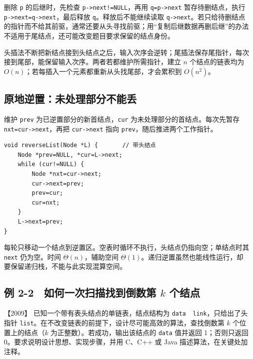 删除 \allowbreak{}\texttt{p} 的后继时，先检查 \allowbreak{}\texttt{p-\textgreater{}next!=NULL}，再用 \allowbreak{}\texttt{q=p-\textgreater{}next} 暂存待删结点，执行 \allowbreak{}\texttt{p-\textgreater{}next=q-\textgreater{}next}，最后释放 \allowbreak{}\texttt{q}。释放后不能继续读取 \allowbreak{}\texttt{q-\textgreater{}next}。若只给待删结点的指针而不给其前驱，通常还要从头寻找前驱；用``复制后继数据再删后继''的办法不适用于尾结点，还可能改变题目要求保留的结点身份。

头插法不断把新结点接到头结点之后，输入次序会逆转；尾插法保存尾指针，每次接到尾部，能保留输入次序。两者若都维护所需指针，建立 \(n\) 个结点的链表均为 \(O(n)\)；若每插入一个元素都重新从头找尾部，才会累积到 \(O(n^2)\)。

\subsection{原地逆置：未处理部分不能丢}\label{ds-c02-h52}

维护 \allowbreak{}\texttt{prev} 为已逆置部分的新首结点，\allowbreak{}\texttt{cur} 为未处理部分的首结点。每次先暂存 \allowbreak{}\texttt{nxt=cur-\textgreater{}next}，再把 \allowbreak{}\texttt{cur-\textgreater{}next} 指向 \allowbreak{}\texttt{prev}，随后推进两个工作指针。

\par\medskip\noindent
\begin{minipage}{\linewidth}
\begin{verbatim}
void reverseList(Node *L) {       // 带头结点
    Node *prev=NULL, *cur=L->next;
    while (cur!=NULL) {
        Node *nxt=cur->next;
        cur->next=prev;
        prev=cur;
        cur=nxt;
    }
    L->next=prev;
}
\end{verbatim}
\end{minipage}\par\medskip

每轮只移动一个结点到逆置区。空表时循环不执行，头结点仍指向空；单结点时其 \allowbreak{}\texttt{next} 仍为空。时间 \(\Theta(n)\)，辅助空间 \(\Theta(1)\)。递归逆置虽然也能线性运行，却要保留递归栈，不能与此实现混算空间。

\subsection{\texorpdfstring{例 2-2　如何一次扫描找到倒数第 \(k\) 个结点}{例 2-2　如何一次扫描找到倒数第 k 个结点}}\label{ds-ex2-2}

\noindent{}【2009】 已知一个带有表头结点的单链表，结点结构为 \allowbreak{}\texttt{data\ \textbar{}\ link}，只给出了头指针 \allowbreak{}\texttt{list}。在不改变链表的前提下，设计尽可能高效的算法，查找倒数第 \(k\) 个位置上的结点（\(k\) 为正整数）。若成功，输出该结点的 \allowbreak{}\texttt{data} 值并返回 1；否则只返回 0。要求说明设计思想、实现步骤，并用 C、C++ 或 Java 描述算法，在关键处加注释。

